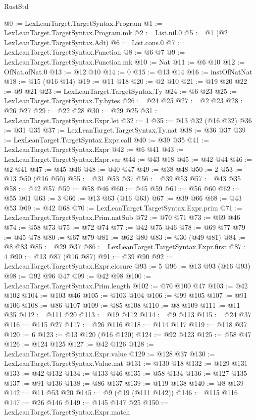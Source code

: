 \begin{lexlean}{RustStd}
\begin{coremodule}
@0 := LexLeanTarget.TargetSyntax.Program
@1 := LexLeanTarget.TargetSyntax.Program.mk
@2 := List.nil.{0}
@5 := @1 (@2 LexLeanTarget.TargetSyntax.Adt)
@6 := List.cons.{0}
@7 := LexLeanTarget.TargetSyntax.Function
@8 := @6 @7
@9 := LexLeanTarget.TargetSyntax.Function.mk
@10 := Nat
@11 := @6 @10
@12 := OfNat.ofNat.{0}
@13 := @12 @10
@14 := 0
@15 := @13 @14
@16 := instOfNatNat
@18 := @15 (@16 @14)
@19 := @11 @18
@20 := @2 @10
@21 := @19 @20
@22 := @9 @21
@23 := LexLeanTarget.TargetSyntax.Ty
@24 := @6 @23
@25 := LexLeanTarget.TargetSyntax.Ty.bytes
@26 := @24 @25
@27 := @2 @23
@28 := @26 @27
@29 := @22 @28
@30 := @29 @25
@31 := LexLeanTarget.TargetSyntax.Expr.let
@32 := 1
@35 := @13 @32 (@16 @32)
@36 := @31 @35
@37 := LexLeanTarget.TargetSyntax.Ty.nat
@38 := @36 @37
@39 := LexLeanTarget.TargetSyntax.Expr.call
@40 := @39 @35
@41 := LexLeanTarget.TargetSyntax.Expr
@42 := @6 @41
@43 := LexLeanTarget.TargetSyntax.Expr.var
@44 := @43 @18
@45 := @42 @44
@46 := @2 @41
@47 := @45 @46
@48 := @40 @47
@49 := @38 @48
@50 := 2
@53 := @13 @50 (@16 @50)
@55 := @31 @53 @37
@56 := @39 @53
@57 := @43 @35
@58 := @42 @57
@59 := @58 @46
@60 := @45 @59
@61 := @56 @60
@62 := @55 @61
@63 := 3
@66 := @13 @63 (@16 @63)
@67 := @39 @66
@68 := @43 @53
@69 := @42 @68
@70 := LexLeanTarget.TargetSyntax.Expr.prim
@71 := LexLeanTarget.TargetSyntax.Prim.natSub
@72 := @70 @71
@73 := @69 @46
@74 := @58 @73
@75 := @72 @74
@77 := @42 @75 @46
@78 := @69 @77
@79 := @45 @78
@80 := @67 @79
@81 := @62 @80
@83 := @30 (@49 @81)
@84 := @8 @83
@85 := @29 @37
@86 := LexLeanTarget.TargetSyntax.Expr.first
@87 := 4
@90 := @13 @87 (@16 @87)
@91 := @39 @90
@92 := LexLeanTarget.TargetSyntax.Expr.closure
@93 := 5
@96 := @13 @93 (@16 @93)
@98 := @92 @96 @47
@99 := @42 @98
@100 := LexLeanTarget.TargetSyntax.Prim.length
@102 := @70 @100 @47
@103 := @42 @102
@104 := @103 @46
@105 := @103 @104
@106 := @99 @105
@107 := @91 @106
@108 := @86 @107
@109 := @85 @108
@110 := @8 @109
@111 := @11 @35
@112 := @111 @20
@113 := @19 @112
@114 := @9 @113
@115 := @24 @37
@116 := @115 @27
@117 := @26 @116
@118 := @114 @117
@119 := @118 @37
@120 := 6
@123 := @13 @120 (@16 @120)
@124 := @92 @123
@125 := @58 @47
@126 := @124 @125
@127 := @42 @126
@128 := LexLeanTarget.TargetSyntax.Expr.value
@129 := @128 @37
@130 := LexLeanTarget.TargetSyntax.Value.nat
@131 := @130 @18
@132 := @129 @131
@133 := @42 @132
@134 := @133 @46
@135 := @58 @134
@136 := @127 @135
@137 := @91 @136
@138 := @86 @137
@139 := @119 @138
@140 := @8 @139
@142 := @11 @53 @20
@145 := @9 (@19 (@111 @142))
@146 := @115 @116
@147 := @26 @146
@149 := @145 @147 @25
@150 := LexLeanTarget.TargetSyntax.Expr.match

\end{coremodule}
\end{lexlean}
